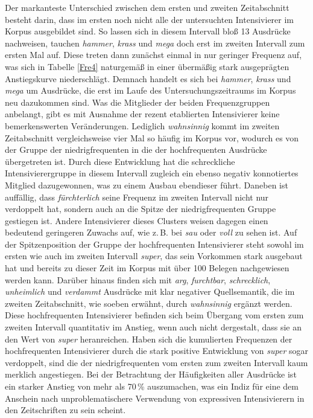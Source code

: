 
Der markanteste Unterschied zwischen dem ersten und zweiten Zeitabschnitt besteht darin, dass im ersten noch nicht alle der untersuchten Intensivierer im Korpus ausgebildet sind. So lassen sich in diesem Intervall bloß 13 Ausdrücke nachweisen, tauchen \textit{hammer}, \textit{krass} und \textit{mega} doch erst im zweiten Intervall zum ersten Mal auf. Diese treten dann zunächst einmal in nur geringer Frequenz auf, was sich in Tabelle \ref{Fre4} naturgemäß in einer übermäßig stark ausgeprägten Anstiegskurve niederschlägt. Demnach handelt es sich bei \textit{hammer}, \textit{krass} und \textit{mega} um Ausdrücke, die erst im Laufe des Untersuchungszeitraums im Korpus neu dazukommen sind. Was die Mitglieder der beiden Frequenzgruppen anbelangt, gibt es mit Ausnahme der rezent etablierten Intensivierer keine bemerkenswerten Veränderungen. Lediglich \textit{wahnsinnig} kommt im zweiten Zeitabschnitt vergleichsweise vier Mal so häufig im Korpus vor, wodurch es von der Gruppe der niedrigfrequenten in die der hochfrequenten Ausdrücke übergetreten ist. Durch diese Entwicklung hat die \glqq{}schreckliche\grqq{} Intensivierergruppe in diesem Intervall zugleich ein ebenso negativ konnotiertes Mitglied dazugewonnen, was zu einem Ausbau ebendieser führt. Daneben ist auffällig, dass \textit{fürchterlich} seine Frequenz im zweiten Intervall nicht nur verdoppelt hat, sondern auch an die Spitze der niedrigfrequenten Gruppe gestiegen ist. Andere Intensivierer dieses Clusters weisen dagegen einen bedeutend geringeren Zuwachs auf, wie z.\,B. bei \textit{sau} oder \textit{voll} zu sehen ist. Auf der Spitzenposition der Gruppe der hochfrequenten Intensivierer steht sowohl im ersten wie auch im zweiten Intervall \textit{super}, das sein Vorkommen stark ausgebaut hat und bereits zu dieser Zeit im Korpus mit über 100 Belegen nachgewiesen werden kann. Darüber hinaus finden sich mit \textit{arg}, \textit{furchtbar}, \textit{schrecklich}, \textit{unheimlich} und \textit{verdammt} Ausdrücke mit klar negativer Quellsemantik, die im zweiten Zeitabschnitt, wie soeben erwähnt, durch \textit{wahnsinnig} ergänzt werden. Diese hochfrequenten Intensivierer befinden sich beim Übergang vom ersten zum zweiten Intervall quantitativ im Anstieg, wenn auch nicht dergestalt, dass sie an den Wert von \textit{super} heranreichen. Haben sich die kumulierten Frequenzen der hochfrequenten Intensivierer durch die stark positive Entwicklung von \textit{super} sogar verdoppelt, sind die der niedrigfrequenten vom ersten zum zweiten Intervall kaum merklich angestiegen. Bei der Betrachtung der Häufigkeiten aller Ausdrücke ist ein starker Anstieg von mehr als 70\,\% auszumachen, was ein Indiz für eine dem Anschein nach unproblematischere Verwendung von expressiven Intensivierern in den Zeitschriften zu sein scheint.


